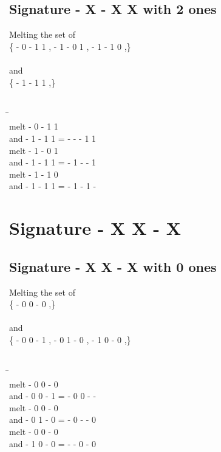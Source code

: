 \documentclass{article}
\begin{document}
\subsection{Signature - X - X X with 2 ones}
Melting the set of\\
\{ -  0  -  1  1 , -  1  -  0  1 , -  1  -  1  0 ,\}\\\\
and\\
\{ -  1  -  1  1 ,\}\\\\
\begin{tabbing}
\hspace{3cm}\=\hspace{3cm}\=\hspace{3cm}\\[1cm]
melt\> -  0  -  1  1 \\
and\> -  1  -  1  1 \>
 =  -  -  -  1  1 \\[1mm]
melt\> -  1  -  0  1 \\
and\> -  1  -  1  1 \>
 =  -  1  -  -  1 \\[1mm]
melt\> -  1  -  1  0 \\
and\> -  1  -  1  1 \>
 =  -  1  -  1  - \\[1mm]
\end{tabbing}
\newpage
\section{Signature - X X - X }
\subsection{Signature - X X - X with 0 ones}
Melting the set of\\
\{ -  0  0  -  0 ,\}\\\\
and\\
\{ -  0  0  -  1 , -  0  1  -  0 , -  1  0  -  0 ,\}\\\\
\begin{tabbing}
\hspace{3cm}\=\hspace{3cm}\=\hspace{3cm}\\[1cm]
melt\> -  0  0  -  0 \\
and\> -  0  0  -  1 \>
 =  -  0  0  -  - \\[1mm]
melt\> -  0  0  -  0 \\
and\> -  0  1  -  0 \>
 =  -  0  -  -  0 \\[1mm]
melt\> -  0  0  -  0 \\
and\> -  1  0  -  0 \>
 =  -  -  0  -  0 \\[1mm]
\end{tabbing}
\newpage
\end{document}

